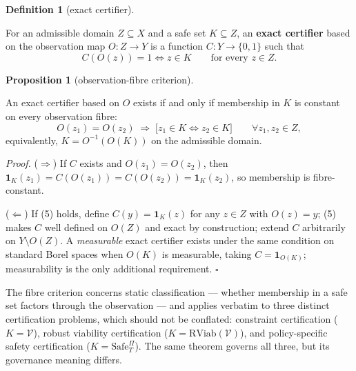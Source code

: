 \documentclass[11pt]{article}
\theoremstyle{definition}
\newtheorem{proposition}{Proposition}
\newtheorem{definition}{Definition}
\begin{document}
\begin{definition}[exact certifier]\label{def:certifier}

For an admissible domain
\(Z \subseteq X\) and a safe set \(K \subseteq Z\), an \textbf{exact
certifier} based on the observation map \(O : Z \to Y\) is a function
\(C : Y \to \{0,1\}\) such that
\[C(O(z)) = 1 \iff z \in K \qquad \text{for every } z \in Z.\]

\end{definition}

\begin{proposition}[observation-fibre criterion]\label{prop:fibre}

An exact certifier
based on \(O\) exists if and only if membership in \(K\) is constant on
every observation fibre:
\[O(z_1) = O(z_2) \;\Longrightarrow\; \big[ z_1 \in K \iff z_2 \in K \big] \qquad \forall z_1, z_2 \in Z, \tag{5}\]
equivalently, \(K = O^{-1}(O(K))\) on the admissible domain.

\end{proposition}

\emph{Proof.} (\(\Rightarrow\)) If \(C\) exists and \(O(z_1) = O(z_2)\),
then \(\mathbf{1}_K(z_1) = C(O(z_1)) = C(O(z_2)) = \mathbf{1}_K(z_2)\),
so membership is fibre-constant.

(\(\Leftarrow\)) If (5) holds, define \(C(y) = \mathbf{1}_K(z)\) for any
\(z \in Z\) with \(O(z) = y\); (5) makes \(C\) well defined on \(O(Z)\)
and exact by construction; extend \(C\) arbitrarily on
\(Y \setminus O(Z)\). A \emph{measurable} exact certifier exists under
the same condition on standard Borel spaces when \(O(K)\) is measurable,
taking \(C = \mathbf{1}_{O(K)}\); measurability is the only additional requirement. \ensuremath{\square}

The fibre criterion concerns static classification --- whether
membership in a safe set factors through the observation --- and applies
verbatim to three distinct certification problems, which should not be
conflated: constraint certification (\(K = \mathcal{V}\)), robust
viability certification (\(K = \mathrm{RViab}(\mathcal{V})\)), and
policy-specific safety certification (\(K = \mathrm{Safe}^{\Pi}_T\)).
The same theorem governs all three, but its governance meaning differs.
\end{document}
